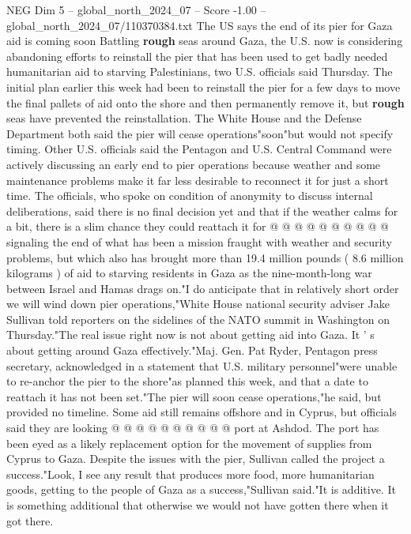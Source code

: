 \begin{textsample}{NEG Dim 5 – global\_north\_2024\_07 – Score -1.00 – global\_north\_2024\_07/110370384.txt}  \label{ex:f5_neg_152}
The US says the end of its pier for Gaza aid is coming soon Battling \textbf{rough} seas around Gaza, the U.S. now is considering abandoning efforts to reinstall the pier that has been used to get badly needed humanitarian aid to starving Palestinians, two U.S. officials said Thursday.
The initial plan earlier this week had been to reinstall the pier for a few days to move the final pallets of aid onto the shore and then permanently remove it, but \textbf{rough} seas have prevented the reinstallation.
The White House and the Defense Department both said the pier will cease operations"soon"but would not specify timing.
Other U.S. officials said the Pentagon and U.S.
Central Command were actively discussing an early end to pier operations because weather and some maintenance problems make it far less desirable to reconnect it for just a short time.
The officials, who spoke on condition of anonymity to discuss internal deliberations, said there is no final decision yet and that if the weather calms for a bit, there is a slim chance they could reattach it for @ @ @ @ @ @ @ @ @ @ signaling the end of what has been a mission fraught with weather and security problems, but which also has brought more than 19.4 million pounds ( 8.6 million kilograms ) of aid to starving residents in Gaza as the nine-month-long war between Israel and Hamas drags on."I do anticipate that in relatively short order we will wind down pier operations,"White House national security adviser Jake Sullivan told reporters on the sidelines of the NATO summit in Washington on Thursday."The real issue right now is not about getting aid into Gaza.
It ' s about getting around Gaza effectively."Maj.
Gen.
Pat Ryder, Pentagon press secretary, acknowledged in a statement that U.S. military personnel"were unable to re-anchor the pier to the shore"as planned this week, and that a date to reattach it has not been set."The pier will soon cease operations,"he said, but provided no timeline.
Some aid still remains offshore and in Cyprus, but officials said they are looking @ @ @ @ @ @ @ @ @ @ port at Ashdod.
The port has been eyed as a likely replacement option for the movement of supplies from Cyprus to Gaza.
Despite the issues with the pier, Sullivan called the project a success."Look, I see any result that produces more food, more humanitarian goods, getting to the people of Gaza as a success,"Sullivan said."It is additive.
It is something additional that otherwise we would not have gotten there when it got there.

\end{textsample}
